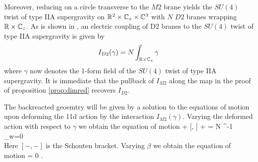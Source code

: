 Moreover, reducing on a circle transverse to the $M2$ brane yields the $SU(4)$ twist of type IIA supergravity on $\mathbb{R}^2\times \mathbb{C}_z\times \mathbb{C}^3$ with $N$ $D2$ branes wrapping $\mathbb{R}\times \mathbb{C}_z$. As is shown in \cite{CLsugra}, an electric coupling of D2 branes to the $SU(4)$ twist of type IIA supergravity is given by 
\[
I_{D2}(\gamma) = N \int_{\mathbb{R}\times\mathbb{C}_z} \gamma
\] 
where $\gamma$ now denotes the 1-form field of the $SU(4)$ twist of type IIA supergravity. It is immediate that the pullback of $I_{M2}$ along the map in the proof of proposition \ref{prop:dimred} recovers $I_{D2}$. 






The backreacted geoemtry will be given by a solution to the equations of motion upon deforming the 11d action by the interaction $I_{M2}(\gamma)$. 
Varying the deformed action with respect to $\gamma$ 
we obtain the equation of motion
\beqn\label{eqn:ads4eom1}
\dbar \mu +  [\mu, \mu] + \partial\gamma\partial\gamma = N \Omega^{-1} \delta_{w=0} \\
\eeqn
Here $[-,-]$ is the Schouten bracket. 
Varying $\beta$ we obtain the equation of motion
\beqn\label{eqn:adseom2}
\div \mu = 0 .
\eeqn

